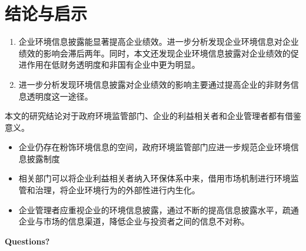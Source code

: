 \documentclass{beamer}	%
\theoremstyle{plain}
\theoremstyle{definition}
\theoremstyle{remark}
\numberwithin{equation}{section}
\begin{document}
\section{结论与启示}
\begin{frame}
	\begin{enumerate}[1]
		\item 企业环境信息披露能显著提高企业绩效。进一步分析发现企业环境信息对企业绩效的影响会滞后两年。同时，本文还发现企业环境信息披露对企业绩效的促进作用在低财务透明度和非国有企业中更为明显。 \pause
		\item 进一步分析发现环境信息披露对企业绩效的影响主要通过提高企业的非财务信息透明度这一途径。 \pause
	\end{enumerate} \vspace{0.5cm}
	
本文的研究结论对于政府环境监管部门、企业的利益相关者和企业管理者都有借鉴意义。
	
	\begin{itemize}
		\item 企业仍存在粉饰环境信息的空间，政府环境监管部门应进一步规范企业环境信息披露制度
		\item 相关部门可以将企业利益相关者纳入环保体系中来，借用市场机制进行环境监管和治理，将企业环境行为的外部性进行内生化。
		\item 企业管理者应重视企业的环境信息披露，通过不断的提高信息披露水平，疏通企业与市场的信息渠道，降低企业与投资者之间的信息不对称。
	\end{itemize}
\end{frame}
\begin{frame}
	\begin{center} {\bfseries \Large Questions?} \end{center}
\end{frame}
\end{document}
